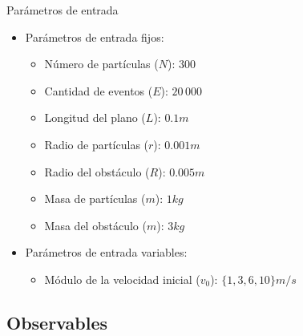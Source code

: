 \documentclass{beamer}
\begin{document}
            \begin{frame}{Parámetros de entrada}
                \begin{itemize}
                    \item Parámetros de entrada fijos:
                    \begin{itemize}
                        \item Número de partículas ($N$): \alert{$300$}
                        \item Cantidad de eventos ($E$): \alert{$20\,000$}
                        \item Longitud del plano ($L$): \alert{$0.1 m$}
                        \item Radio de partículas ($r$): \alert{$0.001 m$}
                        \item Radio del obstáculo ($R$): \alert{$0.005 m$}
                        \item Masa de partículas ($m$): \alert{$1 kg$}
                        \item Masa del obstáculo ($m$): \alert{$3 kg$}
                    \end{itemize}
                    \item Parámetros de entrada variables:
                    \begin{itemize}
                        \item Módulo de la velocidad inicial ($v_0$): \alert{$\{1, 3, 6, 10\} m/s$}
                    \end{itemize}
                \end{itemize}
            \end{frame}

        \subsection{Observables}
\end{document}
